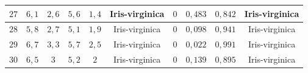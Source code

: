 \begin{table}[H]
{\begin{tabular}{|c|c|c|c|c|c|c|c|c|c|}
        $27$ & $6{,}1$ & $2{,}6$ & $5{,}6$ & $1{,}4$ & Iris-virginica   & $0$ & $0{,}483$ & $0{,}842$ & \cellcolor{green!20}Iris-virginica \\ \hline
        $28$ & $5{,}8$ & $2{,}7$ & $5{,}1$ & $1{,}9$ & Iris-virginica   & $0$ & $0{,}098$ & $0{,}941$ & \cellcolor{green!20}Iris-virginica \\ \hline
        $29$ & $6{,}7$ & $3{,}3$ & $5{,}7$ & $2{,}5$ & Iris-virginica   & $0$ & $0{,}022$ & $0{,}991$ & \cellcolor{green!20}Iris-virginica \\ \hline
        $30$ & $6{,}5$ & $3$     & $5{,}2$ & $2$     & Iris-virginica   & $0$ & $0{,}139$ & $0{,}895$ & \cellcolor{green!20}Iris-virginica \\ \hline
    \end{tabular}%
    }
    \label{tab:klasifikavimo_tikimybes}
\end{table}